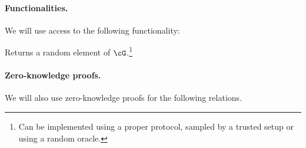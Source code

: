 \paragraph{Functionalities.}
We will use access to the following functionality:
\begin{functionality}[\randomH]\label{func:randomH}
Returns a random element of $\cG$.\footnote{Can be implemented using a proper protocol,  sampled by a trusted  setup or using a random oracle.} 

\end{functionality}
 

\paragraph{Zero-knowledge proofs.}
We will also use zero-knowledge proofs  for the following relations.


